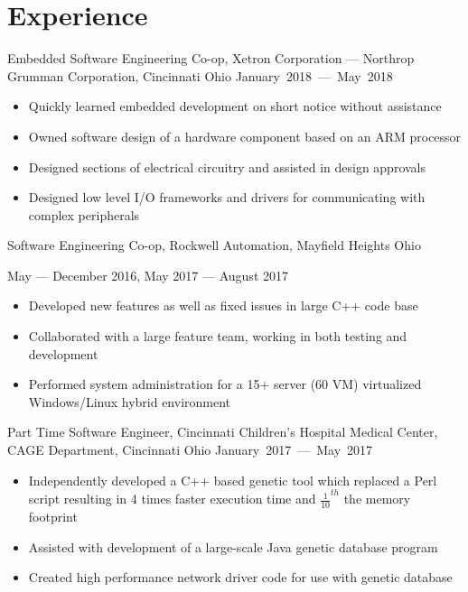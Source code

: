 \newcommand{\expentry}[2]{%
    {#1} \hfill \mbox{#2}
}

\section{Experience}
\expentry{Embedded Software Engineering Co-op, Xetron Corporation --- Northrop
Grumman Corporation, Cincinnati Ohio}{January 2018 --- May 2018}
\begin{itemize}
    \itemsep0em
    \item Quickly learned embedded development on short notice without
        assistance
    \item Owned software design of a hardware component based on an ARM
        processor
    \item Designed sections of electrical circuitry and assisted in design
        approvals
    \item Designed low level I/O frameworks and drivers for communicating with
        complex peripherals
\end{itemize}
Software Engineering Co-op, Rockwell Automation, Mayfield Heights Ohio
\begin{flushright}
May --- December 2016, May 2017 --- August 2017
\end{flushright}
\begin{itemize}
    \itemsep0em
    \item Developed new features as well as fixed issues in large C++ code base
    \item Collaborated with a large feature team, working in both testing and
        development
    \item Performed system administration for a 15+ server (60 VM) virtualized
        Windows/Linux hybrid environment
\end{itemize}
\expentry{Part Time Software Engineer, Cincinnati Children's Hospital Medical
Center, CAGE Department, Cincinnati Ohio}{January 2017 --- May 2017}
\begin{itemize}
    \itemsep0em{}
    \item Independently developed a C++ based genetic tool which replaced a Perl
        script resulting in 4 times faster execution time and
        \({\frac{1}{10}}^{th}\) the memory footprint
    \item Assisted with development of a large-scale Java genetic database
        program
    \item Created high performance network driver code for use with genetic
        database
\end{itemize}
